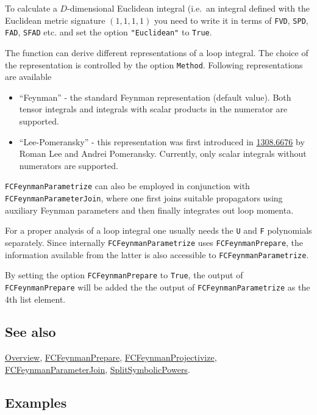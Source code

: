 \documentclass[../FeynCalcManual.tex]{subfiles}
\begin{document}
To calculate a \(D\)-dimensional Euclidean integral (i.e.~an integral
defined with the Euclidean metric signature \((1,1,1,1)\) you need to
write it in terms of \texttt{FVD}, \texttt{SPD}, \texttt{FAD},
\texttt{SFAD} etc. and set the option \texttt{"Euclidean"} to
\texttt{True}.

The function can derive different representations of a loop integral.
The choice of the representation is controlled by the option
\texttt{Method}. Following representations are available

\begin{itemize}
\tightlist
\item
  ``Feynman'' - the standard Feynman representation (default value).
  Both tensor integrals and integrals with scalar products in the
  numerator are supported.
\item
  ``Lee-Pomeransky'' - this representation was first introduced in
  \href{https://arxiv.org/abs/1308.6676}{1308.6676} by Roman Lee and
  Andrei Pomeransky. Currently, only scalar integrals without numerators
  are supported.
\end{itemize}

\texttt{FCFeynmanParametrize} can also be employed in conjunction with
\texttt{FCFeynmanParameterJoin}, where one first joins suitable
propagators using auxiliary Feynman parameters and then finally
integrates out loop momenta.

For a proper analysis of a loop integral one usually needs the
\texttt{U} and \texttt{F} polynomials separately. Since internally
\texttt{FCFeynmanParametrize} uses \texttt{FCFeynmanPrepare}, the
information available from the latter is also accessible to
\texttt{FCFeynmanParametrize}.

By setting the option \texttt{FCFeynmanPrepare} to \texttt{True}, the
output of \texttt{FCFeynmanPrepare} will be added the the output of
\texttt{FCFeynmanParametrize} as the 4th list element.

\subsection{See also}

\hyperlink{toc}{Overview},
\hyperlink{fcfeynmanprepare}{FCFeynmanPrepare},
\hyperlink{fcfeynmanprojectivize}{FCFeynmanProjectivize},
\hyperlink{fcfeynmanparameterjoin}{FCFeynmanParameterJoin},
\hyperlink{splitsymbolicpowers}{SplitSymbolicPowers}.

\subsection{Examples}
\end{document}
